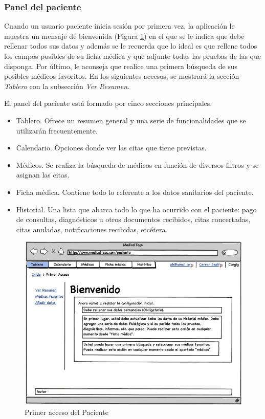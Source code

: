 		
	

	\subsubsection{Panel del paciente} %
		\label{sub:panel_paciente}
	
		Cuando un usuario paciente inicia sesión por primera vez, la aplicación le muestra un mensaje de bienvenida (Figura \ref{fig:iu_tablero_paciente_inicial}) en el que se le indica que debe rellenar todos sus datos y además se le recuerda que lo ideal es que rellene todos los campos posibles de su ficha médica y que adjunte todas las pruebas de las que disponga. Por último, le aconseja que realice una primera búsqueda de sus posibles médicos favoritos. En los siguientes accesos, se mostrará la sección \textit{Tablero} con la subsección \textit{Ver Resumen}.		
	
		El panel del paciente está formado por cinco secciones principales.
		\begin{itemize}
			\item Tablero. Ofrece un resumen general y una serie de funcionalidades que se utilizarán frecuentemente.
			\item Calendario. Opciones donde ver las citas que tiene previstas.
			\item Médicos. Se realiza la búsqueda de médicos en función de diversos filtros y se asignan las citas.
			\item Ficha médica. Contiene todo lo referente a los datos sanitarios del paciente.
			\item Historial. Una lista que abarca todo lo que ha ocurrido con el paciente: pago de consultas, diagnósticos u otros documentos recibidos, citas concertadas, citas anuladas, notificaciones recibidas, etcétera. 
		\end{itemize}
		
		\begin{figure}[H]
		  \centering
		    \includegraphics[width=12cm]{img/png/interfaz/25_Tablero_Paciente.png}
		  \caption{Primer acceso del Paciente}
		  \label{fig:iu_tablero_paciente_inicial}
		\end{figure}
	
